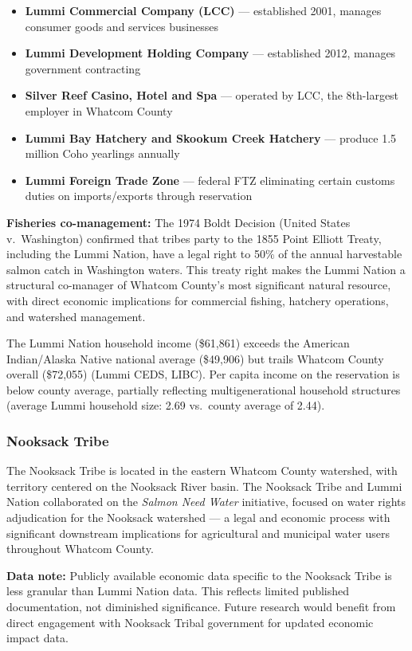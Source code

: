 \documentclass[11pt,letterpaper]{article}
\begin{document}
\begin{itemize}[leftmargin=*]
  \item \textbf{Lummi Commercial Company (LCC)} --- established 2001, manages consumer goods and services businesses
  \item \textbf{Lummi Development Holding Company} --- established 2012, manages government contracting
  \item \textbf{Silver Reef Casino, Hotel and Spa} --- operated by LCC, the 8th-largest employer in Whatcom County
  \item \textbf{Lummi Bay Hatchery and Skookum Creek Hatchery} --- produce 1.5 million Coho yearlings annually
  \item \textbf{Lummi Foreign Trade Zone} --- federal FTZ eliminating certain customs duties on imports/exports through reservation
\end{itemize}

\textbf{Fisheries co-management:} The 1974 Boldt Decision (United States v.\ Washington) confirmed that tribes party to the 1855 Point Elliott Treaty, including the Lummi Nation, have a legal right to 50\% of the annual harvestable salmon catch in Washington waters. This treaty right makes the Lummi Nation a structural co-manager of Whatcom County's most significant natural resource, with direct economic implications for commercial fishing, hatchery operations, and watershed management.

The Lummi Nation household income (\$61,861) exceeds the American Indian/Alaska Native national average (\$49,906) but trails Whatcom County overall (\$72,055) (Lummi CEDS, LIBC). Per capita income on the reservation is below county average, partially reflecting multigenerational household structures (average Lummi household size: 2.69 vs.\ county average of 2.44).

\subsubsection{Nooksack Tribe}

The Nooksack Tribe is located in the eastern Whatcom County watershed, with territory centered on the Nooksack River basin. The Nooksack Tribe and Lummi Nation collaborated on the \emph{Salmon Need Water} initiative, focused on water rights adjudication for the Nooksack watershed --- a legal and economic process with significant downstream implications for agricultural and municipal water users throughout Whatcom County.

\textbf{Data note:} Publicly available economic data specific to the Nooksack Tribe is less granular than Lummi Nation data. This reflects limited published documentation, not diminished significance. Future research would benefit from direct engagement with Nooksack Tribal government for updated economic impact data.
\end{document}
